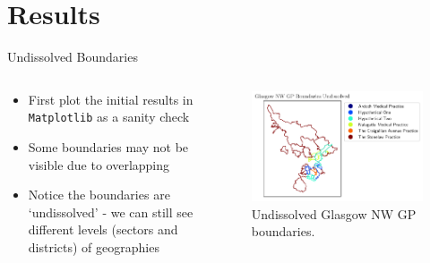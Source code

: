 \documentclass[hyperref={breaklinks,colorlinks,
   urlcolor=blue,citecolor=blue,linkcolor=red}]{beamer}
\begin{document}
\section{Results}
\begin{frame}{Undissolved Boundaries}
\begin{columns}
\begin{column}{0.5\textwidth}
\begin{itemize}
\item{First plot the initial results in \texttt{Matplotlib}
as a sanity check}
\item{Some boundaries may not be visible due to overlapping}
\item{Notice the boundaries are `undissolved' - we can still see different levels (sectors and districts) of geographies}
\end{itemize}
\end{column}

\begin{column}{0.7\textwidth}
\begin{figure}
\begin{center}
\includegraphics[scale=0.5]{geography_test}
\caption{Undissolved Glasgow NW GP boundaries.}
\end{center}
\end{figure}
\end{column}
\end{columns}
\end{frame}
\end{document}
